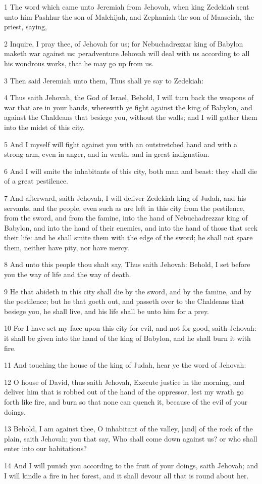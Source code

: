 \par 1 The word which came unto Jeremiah from Jehovah, when king Zedekiah sent unto him Pashhur the son of Malchijah, and Zephaniah the son of Maaseiah, the priest, saying,
\par 2 Inquire, I pray thee, of Jehovah for us; for Nebuchadrezzar king of Babylon maketh war against us: peradventure Jehovah will deal with us according to all his wondrous works, that he may go up from us.
\par 3 Then said Jeremiah unto them, Thus shall ye say to Zedekiah:
\par 4 Thus saith Jehovah, the God of Israel, Behold, I will turn back the weapons of war that are in your hands, wherewith ye fight against the king of Babylon, and against the Chaldeans that besiege you, without the walls; and I will gather them into the midst of this city.
\par 5 And I myself will fight against you with an outstretched hand and with a strong arm, even in anger, and in wrath, and in great indignation.
\par 6 And I will smite the inhabitants of this city, both man and beast: they shall die of a great pestilence.
\par 7 And afterward, saith Jehovah, I will deliver Zedekiah king of Judah, and his servants, and the people, even such as are left in this city from the pestilence, from the sword, and from the famine, into the hand of Nebuchadrezzar king of Babylon, and into the hand of their enemies, and into the hand of those that seek their life: and he shall smite them with the edge of the sword; he shall not spare them, neither have pity, nor have mercy.
\par 8 And unto this people thou shalt say, Thus saith Jehovah: Behold, I set before you the way of life and the way of death.
\par 9 He that abideth in this city shall die by the sword, and by the famine, and by the pestilence; but he that goeth out, and passeth over to the Chaldeans that besiege you, he shall live, and his life shall be unto him for a prey.
\par 10 For I have set my face upon this city for evil, and not for good, saith Jehovah: it shall be given into the hand of the king of Babylon, and he shall burn it with fire.
\par 11 And touching the house of the king of Judah, hear ye the word of Jehovah:
\par 12 O house of David, thus saith Jehovah, Execute justice in the morning, and deliver him that is robbed out of the hand of the oppressor, lest my wrath go forth like fire, and burn so that none can quench it, because of the evil of your doings.
\par 13 Behold, I am against thee, O inhabitant of the valley, [and] of the rock of the plain, saith Jehovah; you that say, Who shall come down against us? or who shall enter into our habitations?
\par 14 And I will punish you according to the fruit of your doings, saith Jehovah; and I will kindle a fire in her forest, and it shall devour all that is round about her.

